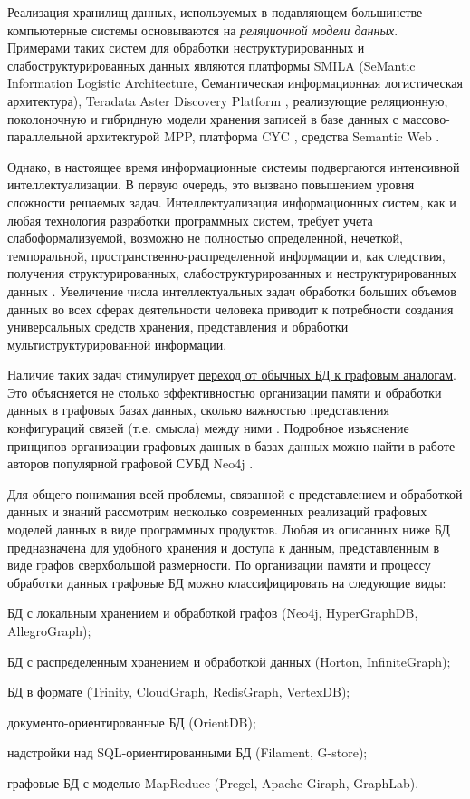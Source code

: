 Реализация хранилищ данных, используемых в подавляющем большинстве компьютерные системы основываются на \textit{реляционной модели данных}. Примерами таких систем для обработки неструктурированных и слабоструктурированных данных являются платформы SMILA (SeMantic Information Logistic Architecture, Семантическая информационная логистическая архитектура), Teradata Aster Discovery Platform \cite{ballinger2009teradata}, реализующие реляционную, поколоночную и гибридную модели хранения записей в базе данных с массово-параллельной архитектурой MPP, платформа CYC \cite{CycPlatform2022}, средства Semantic Web \cite{sem_web}.

Однако, в настоящее время информационные системы подвергаются интенсивной интеллектуализации. В первую очередь, это вызвано повышением уровня сложности решаемых задач. Интеллектуализация информационных систем, как и любая технология разработки программных систем, требует учета слабоформализуемой, возможно не полностью определенной, нечеткой, темпоральной, пространственно-распределенной информации и, как следствия, получения структурированных, слабоструктурированных и неструктурированных данных \cite{Rudikova2018}. Увеличение числа интеллектуальных задач обработки больших объемов данных во всех сферах деятельности человека приводит к потребности создания универсальных средств хранения, представления и обработки мультиструктурированной информации.

Наличие таких задач стимулирует \underline{переход от обычных БД к графовым аналогам}. Это объясняется не столько эффективностью организации памяти и обработки данных в графовых базах данных, сколько важностью представления конфигураций связей (т.е. смысла) между ними . Подробное изъяснение принципов организации графовых данных в базах данных можно найти в работе авторов популярной графовой СУБД Neo4j \cite{GDB}.

Для общего понимания всей проблемы, связанной с представлением и обработкой данных и знаний рассмотрим несколько современных реализаций графовых моделей данных в виде программных продуктов. Любая из описанных ниже БД предназначена для удобного хранения и доступа к данным, представленным в виде графов сверхбольшой размерности. По организации памяти и процессу обработки данных графовые БД можно классифицировать на следующие виды:
\begin{textitemize}
    \item БД с локальным хранением и обработкой графов (Neo4j, HyperGraphDB, AllegroGraph);
    \item БД с распределенным хранением и обработкой данных (Horton, InfiniteGraph);
    \item БД в формате  (Trinity, CloudGraph, RedisGraph, VertexDB);
    \item документо-ориентированные БД (OrientDB);
    \item надстройки над SQL-ориентированными БД (Filament, G-store);
    \item графовые БД с моделью MapReduce (Pregel, Apache Giraph, GraphLab).
\end{textitemize}

